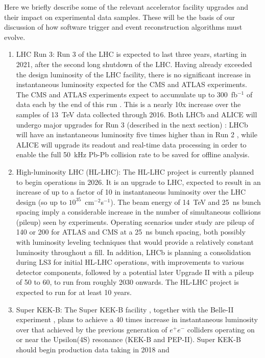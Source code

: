 Here we briefly describe some of the relevant accelerator facility upgrades and their impact on experimental data samples. These will be the basis of our discussion of how 
software trigger and event reconstruction algorithms must evolve.
\begin{enumerate}
\item 
LHC Run 3: Run 3 of the LHC is expected to last three years, starting in 2021, after the second long shutdown of the LHC. Having already exceeded the design luminosity of the 
LHC facility, there is no significant increase in instantaneous luminosity expected for the CMS and ATLAS experiments. The CMS and ATLAS experiments expect to accumulate up to 
300~fb$^{-1}$ of data each by the end of this run \cite{Bordry2016}. This is a nearly 10x increase over the samples of 13~TeV data collected through 2016. Both LHCb and ALICE will undergo 
major upgrades for Run 3 (described in the next section) : LHCb will have an instantaneous luminosity five times higher than in Run 2 \cite{LHCb2012}, while ALICE will 
upgrade \cite{ALICE2013} its readout and real-time data processing in order to enable the full 50~kHz Pb-Pb collision rate to be saved for offline analysis.
\item
High-luminosity LHC (HL-LHC): The HL-LHC project \cite{Zimmerman2009} is currently planned to begin operations in 2026. It is an upgrade to LHC, expected to result in an increase of up 
to a factor of 10 in instantaneous luminosity over the LHC design (so up to $10^{35}$~cm$^{-2}$s$^{-1}$). The beam energy of 14~TeV and 25~ns bunch spacing imply a considerable increase in the 
number of simultaneous collisions (pileup) seen by experiments. Operating scenarios under study are pileup of 140 or 200 for ATLAS \cite{ATLAS2015} and CMS \cite{CMS2015} at a 25~ns bunch 
spacing, both possibly with luminosity leveling techniques that would provide a relatively constant luminosity throughout a fill. In addition, LHCb \cite{LHCb2017} is planning a 
consolidation during LS3 for initial HL-LHC operations, with improvements to various detector components, followed by a potential later Upgrade II with a pileup of 50 to 60, to 
run from roughly 2030 onwards. The HL-LHC project is expected to run for at least 10 years. 
\item
Super KEK-B: The Super KEK-B facility \cite{Ohnishi2013}, together with the Belle-II experiment \cite{BelleII2010}, plans to achieve a 40 times increase in instantaneous luminosity over that 
achieved by the previous generation of $e^+e^-$ colliders operating on or near the Upsilon(4S) resonance (KEK-B and PEP-II). Super KEK-B should begin production data taking in 2018 and 

\end{enumerate}
